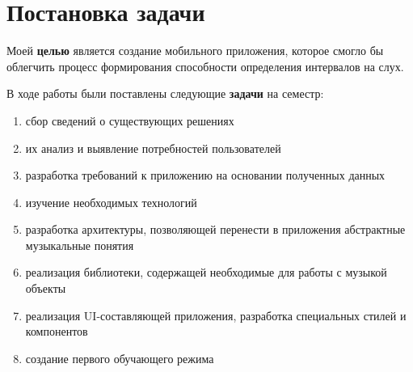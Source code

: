 \chapter{Постановка задачи}
Моей \textbf{целью} является создание мобильного приложения, которое смогло бы облегчить процесс формирования способности определения интервалов на слух. \medskip\par
В ходе работы были поставлены следующие \textbf{задачи} на семестр:
\begin{enumerate}
\item сбор сведений о существующих решениях
\item их анализ и выявление потребностей пользователей
\item разработка требований к приложению на основании полученных данных
\item изучение необходимых технологий
\item разработка архитектуры, позволяющей перенести в приложения абстрактные музыкальные понятия
\item реализация библиотеки, содержащей необходимые для работы с музыкой объекты
\item реализация UI-составляющей приложения, разработка специальных стилей и компонентов
\item создание первого обучающего режима
\end{enumerate}\par